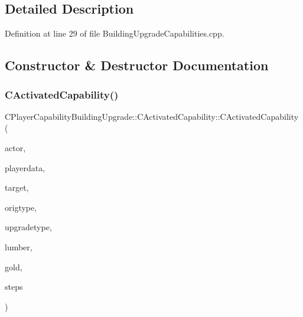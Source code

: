\subsection{Detailed Description}


Definition at line 29 of file Building\+Upgrade\+Capabilities.\+cpp.



\subsection{Constructor \& Destructor Documentation}
\hypertarget{classCPlayerCapabilityBuildingUpgrade_1_1CActivatedCapability_ab0e141246d8b14ba86cbb3146afcf319}{}\label{classCPlayerCapabilityBuildingUpgrade_1_1CActivatedCapability_ab0e141246d8b14ba86cbb3146afcf319} 
\subsubsection{\texorpdfstring{C\+Activated\+Capability()}{CActivatedCapability()}}
{\footnotesize\ttfamily C\+Player\+Capability\+Building\+Upgrade\+::\+C\+Activated\+Capability\+::\+C\+Activated\+Capability (\begin{DoxyParamCaption}\item[{std\+::shared\+\_\+ptr$<$ \hyperlink{classCPlayerAsset}{C\+Player\+Asset} $>$}]{actor,  }\item[{std\+::shared\+\_\+ptr$<$ \hyperlink{classCPlayerData}{C\+Player\+Data} $>$}]{playerdata,  }\item[{std\+::shared\+\_\+ptr$<$ \hyperlink{classCPlayerAsset}{C\+Player\+Asset} $>$}]{target,  }\item[{std\+::shared\+\_\+ptr$<$ \hyperlink{classCPlayerAssetType}{C\+Player\+Asset\+Type} $>$}]{origtype,  }\item[{std\+::shared\+\_\+ptr$<$ \hyperlink{classCPlayerAssetType}{C\+Player\+Asset\+Type} $>$}]{upgradetype,  }\item[{int}]{lumber,  }\item[{int}]{gold,  }\item[{int}]{steps }\end{DoxyParamCaption})}



